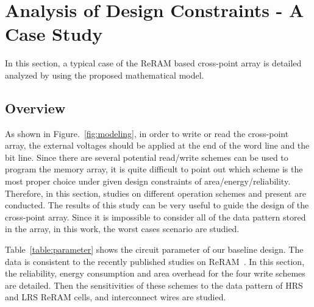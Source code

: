 \vspace{10pt}
\section{Analysis of Design Constraints - A Case Study}\label{sec:w_and_r}

In this section, a typical case of the ReRAM based cross-point array is detailed analyzed by using the proposed mathematical model. 

\subsection{Overview}
As shown in Figure.~\ref{fig:modeling}, in order to write or read the
cross-point array, the external voltages should be applied at the end of
the word line and the bit line. Since there are several potential
read/write schemes can be used to program the memory array, it is
quite difficult to point out which scheme is the most proper choice under given design constraints of area/energy/reliability. Therefore, in this section, studies on different operation schemes and present are conducted. The results of this study can be very useful to guide the design of the cross-point array. Since it is impossible to consider all of the data pattern stored in the array, in this work, the worst cases scenario are studied. 

Table~\ref{table:parameter} shows the circuit parameter of our baseline
design. The data is consistent to the recently published studies on
ReRAM~\cite{crossbar_TED_2010}\cite{memristor:Cong}. In this section, the
reliability, energy consumption and area overhead for the four write
schemes are detailed. Then the sensitivities of these schemes to the data
pattern of HRS and LRS ReRAM cells, and interconnect wires are studied.

